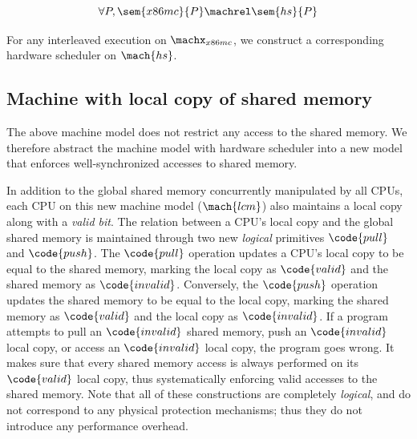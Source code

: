 \begin{lemma}\vspace{-3pt}
\label{lemma:hs}
\begin{small}
$$\forall P, \sem{x86mc}{P}\machrel \sem{hs}{P}$$
\end{small}
\vspace{-10px}
For any interleaved execution on $\machx_{x86mc}$, we construct
a corresponding hardware scheduler on $\mach{hs}$.


\end{lemma}


\vspace{-5pt}
\subsection{Machine with local copy of shared memory}
The above machine model does not restrict any access to the shared memory.
We therefore abstract the machine model with hardware scheduler into
a new model that enforces well-synchronized accesses to shared memory.

In addition to the global shared memory concurrently manipulated by all CPUs,
each CPU on this new machine model ($\mach{lcm}$) also maintains
a local copy along with a \emph{valid bit}.
The relation between a CPU's local copy and the global shared memory
is maintained through two new \emph{logical} primitives $\code{pull}$ and $\code{push}$.
The $\code{pull}$ operation updates a CPU's local copy to be equal to the shared memory,
marking the local copy as $\code{valid}$ and the shared memory as $\code{invalid}$.
Conversely, the $\code{push}$ operation updates the shared memory
to be equal to the local copy, marking the shared memory
as $\code{valid}$ and the local copy as $\code{invalid}$.
If a program attempts to pull an $\code{invalid}$ shared memory, push
an $\code{invalid}$ local copy, or access an $\code{invalid}$ local copy,
the program goes wrong.
It makes sure that every shared memory access is always performed on
its $\code{valid}$ local copy, thus systematically enforcing valid accesses to the
shared memory.
Note that all of these constructions are completely \emph{logical}, and do not
correspond to any physical protection mechanisms; thus they do not introduce any
performance overhead.

